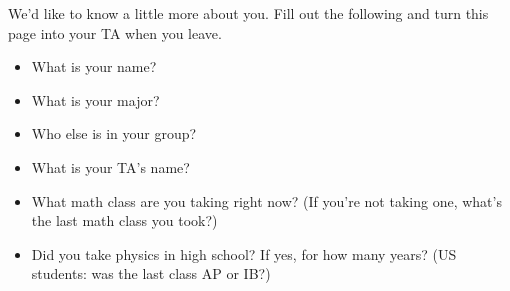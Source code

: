 \documentclass[12pt]{article}
\newcommand{\BI}{\begin{itemize}}
\newcommand{\EI}{\end{itemize}}
\begin{document}
We'd like to know a little more about you. Fill out the following and turn this page into your TA when you leave.

\BI

\item What is your name?
\vspace{0.6in}
\item What is your major?
\vspace{0.6in}

\item Who else is in your group? 
\vspace{0.6in}

\item What is your TA's name?
\vspace{0.6in}

\item What math class are you taking right now? (If you're not taking one, what's the last math class you took?)
\vspace{0.6in}

\item Did you take physics in high school? If yes, for how many years? (US students: was the last class AP or IB?)
\vspace{0.6in}

\EI
\end{document}
